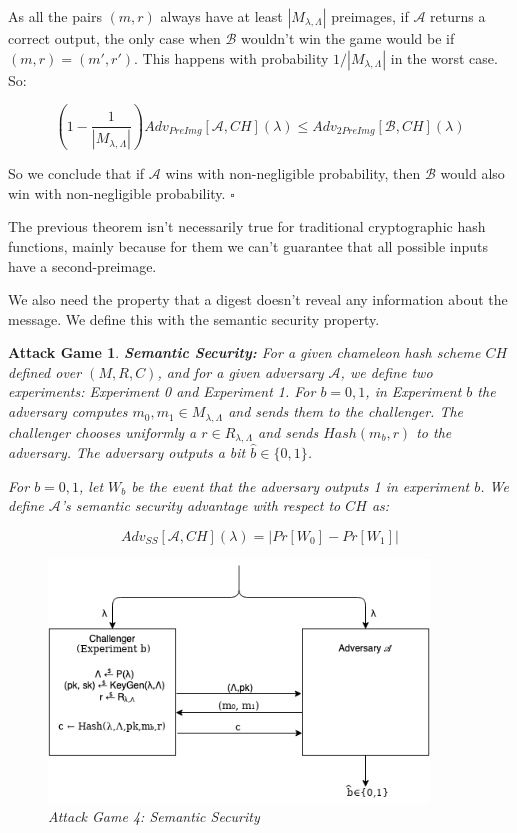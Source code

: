 \documentclass[a4paper]{article}
\newtheorem{game}{Attack Game}
\newcommand*{\qed}{\hfill\ensuremath{\square}}
\begin{document}
    As all the pairs $(m, r)$ always have at least $|M_{\lambda,\Lambda}|$
    preimages, if $\mathcal{A}$ returns a correct output, the only
    case when $\mathcal{B}$ wouldn't win the game would be if
    $(m, r) = (m', r')$. This happens with probability
    $1/|M_{\lambda,\Lambda}|$ in the worst case.
    So:
    
    $$
    \left(1-\frac{1}{|M_{\lambda,\Lambda}|}\right)
    Adv_{PreImg}[\mathcal{A},CH](\lambda) \leq Adv_{2PreImg}[\mathcal{B},CH](\lambda)
    $$
    
    So we conclude that if $\mathcal{A}$ wins with non-negligible probability, then $\mathcal{B}$
    would also win with non-negligible probability. \qed
    
    The previous theorem isn't necessarily true for traditional
    cryptographic hash functions, mainly because for them we can't
    guarantee that all possible inputs have a second-preimage.
    
    We also need the property that a digest doesn't reveal any information
    about the message. We define this with the semantic security property.
    
    \begin{game}
    \textbf{Semantic Security: }For a given chameleon hash scheme $CH$
    defined over $(M, R, C)$, and for a given adversary $\mathcal{A}$,
    we define two experiments: Experiment 0 and Experiment 1. For $b=0,1$,
    in Experiment $b$ the adversary computes 
    $m_0, m_1 \in M_{\lambda,\Lambda}$ and sends them to the challenger.
    The challenger chooses uniformly a $r \in R_{\lambda,\Lambda}$
    and sends $Hash(m_b, r)$ to the adversary. The adversary outputs a
    bit $\hat b\in \{0,1\}$.
    
    For $b=0,1$, let $W_b$ be the event that the adversary outputs
    1 in experiment $b$. We define $\mathcal{A}$'s semantic security
    advantage with respect to $CH$ as:
    
    $$
    Adv_{SS}[\mathcal{A}, CH](\lambda) = |Pr[W_0]-Pr[W_1]|
    $$
    
    \begin{figure}
      \centering
          \includegraphics[width=0.9\textwidth]{imagens/semantic.png}
      \caption{Attack Game 4: Semantic Security}
    \end{figure}
    \end{game}
    
\end{document}
